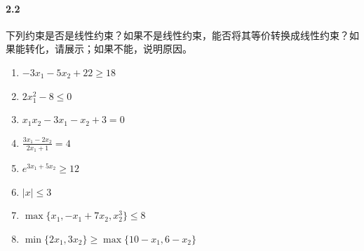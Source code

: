 \documentclass[12pt,a4paper]{article}
\begin{document}
\paragraph{2.2}

下列约束是否是线性约束？如果不是线性约束，能否将其等价转换成线性约束？如果能转化，请展示；如果不能，说明原因。
\begin{enumerate}
	
	\item $ -3x_1-5x_2+22 \geq 18$
	
	\item $2x_1^2 -8 \leq 0$
	
	\item $x_1x_2-3x_1-x_2+3=0$
	
	\item $\frac{3x_1-2x_2}{2x_1+1} = 4$
	
	\item $e^{3x_1+5x_2} \geq 12$
	
	\item $|x| \leq 3$
	
	\item $\max\{x_1, -x_1+7x_2, x_2^3\} \leq 8$
	
	\item $\min\{2x_1,3x_2\} \geq \max\{10-x_1,6-x_2\}$
	
	
\end{enumerate}
\end{document}
